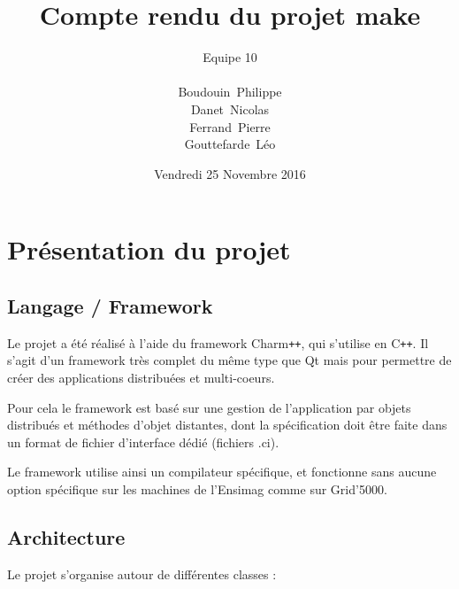 \documentclass[a4paper, 11pt, titlepage]{article}
\title {{ {\huge Compte rendu du projet make }} }
\author{\Large Equipe 10 \\
\\
    {\sc Boudouin}~Philippe\\
    {\sc Danet}~Nicolas\\
    {\sc Ferrand}~Pierre\\
    {\sc Gouttefarde}~Léo
}
\date{Vendredi 25 Novembre 2016}
\begin{document}
\pagestyle{fancy}
\maketitle

\setcounter{tocdepth}{2}

\tableofcontents
\newpage

\section {Présentation du projet}

\subsection {Langage / Framework}

Le projet a été réalisé à l'aide du framework Charm\texttt{++}, qui s'utilise en C\texttt{++}.
Il s'agit d'un framework très complet du même type que Qt mais pour permettre de créer des applications distribuées et multi-coeurs.

Pour cela le framework est basé sur une gestion de l'application par objets distribués et méthodes d'objet distantes, dont la spécification doit être faite dans un format de fichier d'interface dédié (fichiers .ci).

Le framework utilise ainsi un compilateur spécifique, et fonctionne sans aucune option spécifique sur les machines de l'Ensimag comme sur Grid'5000.


\subsection {Architecture}

Le projet s'organise autour de différentes classes :
\end{document}
